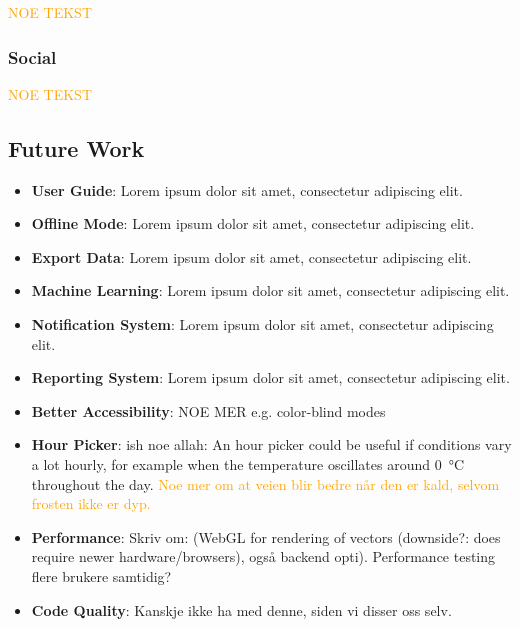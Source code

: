 \textcolor{orange}{NOE TEKST}

\subsubsection{Social}

\textcolor{orange}{NOE TEKST}

\subsection{Future Work}

\begin{itemize}
    \item \textbf{User Guide}: Lorem ipsum dolor sit amet, consectetur adipiscing elit.
    \item \textbf{Offline Mode}: Lorem ipsum dolor sit amet, consectetur adipiscing elit.
    \item \textbf{Export Data}: Lorem ipsum dolor sit amet, consectetur adipiscing elit.
    \item \textbf{Machine Learning}: Lorem ipsum dolor sit amet, consectetur adipiscing elit.
    \item \textbf{Notification System}: Lorem ipsum dolor sit amet, consectetur adipiscing elit.
    \item \textbf{Reporting System}: Lorem ipsum dolor sit amet, consectetur adipiscing elit.
    \item \textbf{Better Accessibility}: NOE MER e.g. color-blind modes
    \item \textbf{Hour Picker}: ish noe allah: An hour picker could be useful if conditions vary a lot hourly, for example when the temperature oscillates around \qty{0}{\celsius} throughout the day. \textcolor{orange}{Noe mer om at veien blir bedre når den er kald, selvom frosten ikke er dyp.}
    \item \textbf{Performance}: Skriv om: (WebGL for rendering of vectors (downside?: does require newer hardware/browsers), også backend opti). Performance testing flere brukere samtidig?
    \item \textbf{Code Quality}: Kanskje ikke ha med denne, siden vi disser oss selv.
\end{itemize}

\begin{comment}
    - User Guide
    - Offline Mode (download a map with data)
    - Mobile (har vi alt?)
    - Export Data
    - Machine Learning
    - Notification System
    - (Condition reporting system, si at en trucker kan si at denne veien var dårlig, typ det DF mente)
    - Better Accessibility (e.g. color-blind modes)
    - Hour picker (for mer detaljert data for spesifikke tidspunk, f.eks. om en sjåfør skal kjøre om natten)
    - More Optimization?
        - WebGL for rendering of vectors (downside?: does require newer hardware/browsers)
    - Code Quality, what to add to improve?
\end{comment}
